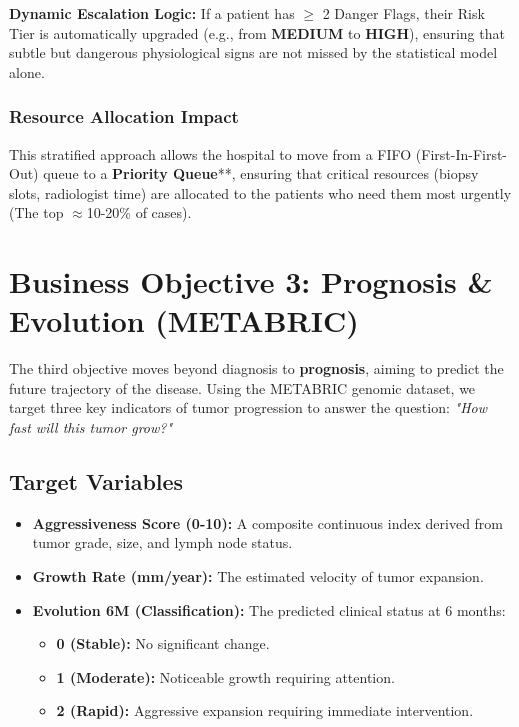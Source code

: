 \textbf{Dynamic Escalation Logic:} If a patient has $\ge$ 2 Danger Flags, their Risk Tier is automatically upgraded (e.g., from \textbf{MEDIUM} to \textbf{HIGH}), ensuring that subtle but dangerous physiological signs are not missed by the statistical model alone.

\subsubsection{Resource Allocation Impact}
This stratified approach allows the hospital to move from a FIFO (First-In-First-Out) queue to a \textbf{Priority Queue}**, ensuring that critical resources (biopsy slots, radiologist time) are allocated to the patients who need them most urgently (The top $\approx$10-20\% of cases).

\section{Business Objective 3: Prognosis \& Evolution (METABRIC)}
The third objective moves beyond diagnosis to \textbf{prognosis}, aiming to predict the future trajectory of the disease. Using the METABRIC genomic dataset, we target three key indicators of tumor progression to answer the question: \textit{"How fast will this tumor grow?"}

\subsection{Target Variables}
\begin{itemize}
    \item \textbf{Aggressiveness Score (0-10):} A composite continuous index derived from tumor grade, size, and lymph node status.
    \item \textbf{Growth Rate (mm/year):} The estimated velocity of tumor expansion.
    \item \textbf{Evolution 6M (Classification):} The predicted clinical status at 6 months:
    \begin{itemize}
        \item \textbf{0 (Stable):} No significant change.
        \item \textbf{1 (Moderate):} Noticeable growth requiring attention.
        \item \textbf{2 (Rapid):} Aggressive expansion requiring immediate intervention.
    \end{itemize}
\end{itemize}

